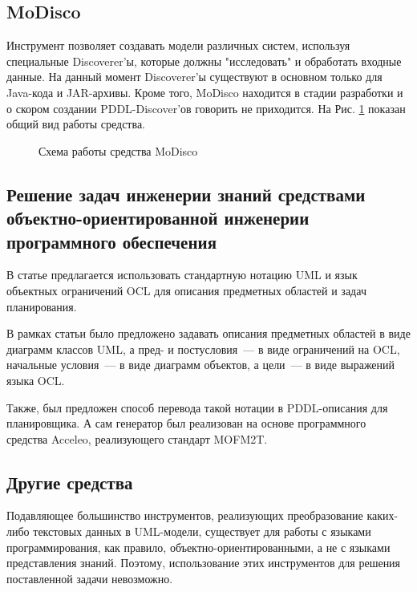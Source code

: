 \documentclass[a4paper,14pt]{extreport}
\begin{document}
    
\subsection*{MoDisco}
    Инструмент позволяет создавать модели различных систем, используя специальные Discoverer'ы, которые должны "исследовать" и обработать входные данные. На данный момент   Discoverer'ы существуют в основном только для Java-кода и JAR-архивы. Кроме того, MoDisco находится в стадии разработки и о скором создании PDDL-Discover'ов говорить не приходится. На  Рис. \ref{img:modisco_overview} показан общий вид работы средства.
    
    \begin{figure}[h]
        \caption{Схема работы средства MoDisco}
        \label{img:modisco_overview}

    \end{figure}    

\subsection*{Решение задач инженерии знаний средствами объектно-ориентированной  инженерии программного обеспечения}    

В статье \cite{mal-manz} предлагается использовать стандартную нотацию UML и язык объектных ограничений OCL для описания предметных областей и задач планирования.

В рамках статьи было предложено задавать описания предметных областей в виде диаграмм классов UML, а пред- и постусловия~--- в виде ограничений на OCL, начальные условия~--- в виде диаграмм объектов, а цели~--- в виде выражений языка OCL. 

Также, был предложен способ перевода такой нотации в PDDL-описания для планировщика. А сам генератор был реализован на основе программного средства Acceleo, реализующего стандарт MOFM2T\cite{mofm2t}. 

    
\subsection*{Другие средства}
     Подавляющее большинство инструментов, реализующих преобразование каких-либо текстовых данных в UML-модели, существует для работы с языками программирования, как правило, объектно-ориентированными, а не с языками представления знаний. Поэтому, использование этих инструментов для решения поставленной задачи невозможно.  
    
\end{document}
